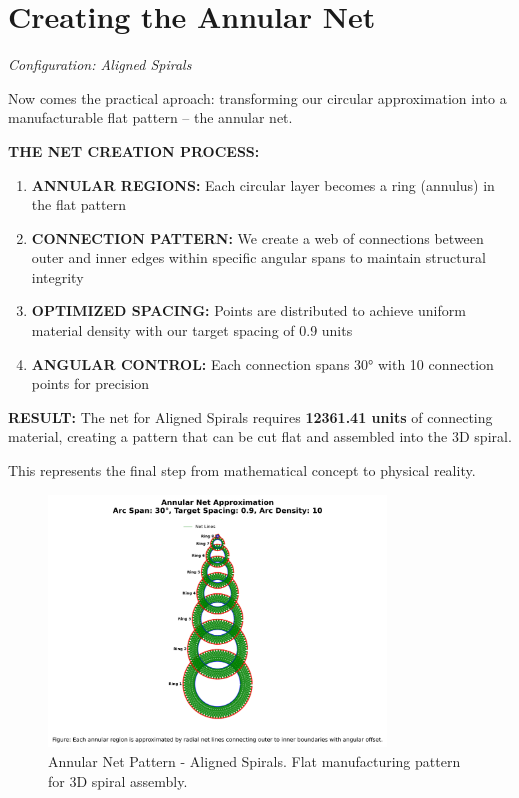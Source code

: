 \documentclass{article}%
\begin{document}
\section{Creating the Annular Net}%
\label{sec:CreatingtheAnnularNet}%
{\large\itshape\color{accentcolor} Configuration: Aligned Spirals}%
\\[0.5cm]%
\begin{storybox}%
Now comes the practical aproach: transforming our circular approximation into
            a manufacturable flat pattern -- the annular net.

            \textbf{THE NET CREATION PROCESS:}
            \begin{enumerate}
                \item \textbf{ANNULAR REGIONS:} Each circular layer becomes a ring (annulus) in the flat pattern
                \item \textbf{CONNECTION PATTERN:} We create a web of connections between outer and inner
                    edges within specific angular spans to maintain structural integrity
                \item \textbf{OPTIMIZED SPACING:} Points are distributed to achieve uniform material density
                    with our target spacing of 0.9 units
                \item \textbf{ANGULAR CONTROL:} Each connection spans 30° 
                    with 10 connection points for precision
            \end{enumerate}

            \textbf{RESULT:} The net for Aligned Spirals requires \textbf{12361.41 units} of connecting
            material, creating a pattern that can be cut flat and assembled into the 3D spiral.

            This represents the final step from mathematical concept to physical reality.%
\end{storybox}%


\begin{figure}[h!]%
\centering%
\includegraphics[width=0.8\textwidth]{net_plot_Aligned_Spirals.png}%
\caption{Annular Net Pattern {-} Aligned Spirals. Flat manufacturing pattern for 3D spiral assembly.}%
\end{figure}
\end{document}
